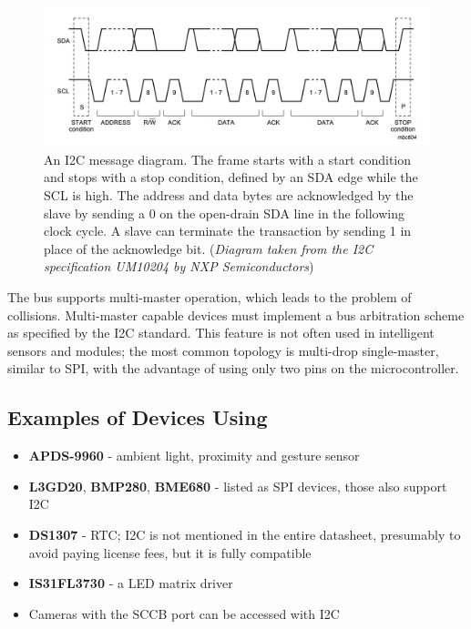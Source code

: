 \begin{figure}[h]
	\centering
	\includegraphics[width=.9\textwidth] {img/i2c-frame.png}
	\caption[\IIC message diagram]{\label{fig:i2c-frame}An \gls{I2C} message diagram. The frame starts with a start condition and stops with a stop condition, defined by an \gls{SDA} edge while the \gls{SCL} is high. The address and data bytes are acknowledged by the slave by sending a 0 on the open-drain \gls{SDA} line in the following clock cycle. A slave can terminate the transaction by sending 1 in place of the acknowledge bit. (\textit{Diagram taken from the \gls{I2C} specification UM10204 by NXP Semiconductors})}
\end{figure}

The bus supports multi-master operation, which leads to the problem of collisions. Multi-master capable devices must implement a bus arbitration scheme as specified by the \gls{I2C} standard. This feature is not often used in intelligent sensors and modules; the most common topology is multi-drop single-master, similar to \gls{SPI}, with the advantage of using only two pins on the microcontroller.

\subsection{Examples of Devices Using \IIC}

\begin{itemize}
	\item \textbf{APDS-9960} - ambient light, proximity and gesture sensor
	\item \textbf{L3GD20}, \textbf{BMP280}, \textbf{BME680} - listed as \gls{SPI} devices, those also support \gls{I2C}
	\item \textbf{DS1307} - \gls{RTC}; \gls{I2C} is not mentioned in the entire datasheet, presumably to avoid paying license fees, but it is fully compatible
	\item \textbf{IS31FL3730} - a \gls{LED} matrix driver
	\item Cameras with the \gls{SCCB} port can be accessed with \gls{I2C}
\end{itemize}

